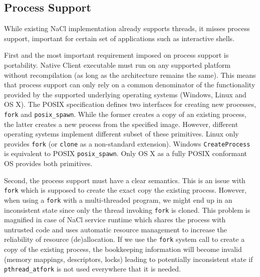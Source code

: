 
\subsection{Process Support}
\label{sub:process_support}

While existing NaCl implementation already supports threads, it misses
process support, important for certain set of applications such as
interactive shells.  

First and the most important requirement imposed on process support is
portability. Native Client executable must run on any supported platform
without recompilation (as long as the architecture remains the same).
This means that process support can only rely on a common denominator of
the functionality provided by the supported underlying operating systems
(\ie Windows, Linux and OS X). The POSIX specification defines two
interfaces for creating new processes, \lstinline`fork` and
\lstinline`posix_spawn`. While the former creates a copy of an existing
process, the latter creates a new process from the specified image.
However, different operating systems implement different subset of these
primitives. Linux only provides \lstinline`fork` (or \lstinline`clone`
as a non-standard extension).  Windows \lstinline`CreateProcess` is
equivalent to POSIX \lstinline`posix_spawn`. Only OS X as a fully POSIX
conformant OS provides both primitives.

Second, the process support must have a clear semantics. This is an
issue with \lstinline`fork` which is supposed to create the exact copy
the existing process. However, when using a \lstinline`fork` with a
multi-threaded program, we might end up in an inconsistent state since
only the thread invoking \lstinline`fork` is cloned.  This problem is
magnified in case of NaCl service runtime which shares the process with
untrusted code and uses automatic resource management to increase the
reliability of resource (de)allocation. If we use the \lstinline`fork`
system call to create a copy of the existing process, the bookkeeping
information will become invalid (\eg memory mappings, descriptors,
locks) leading to potentially inconsistent state if
\lstinline`pthread_atfork` is not used everywhere that it is needed.

